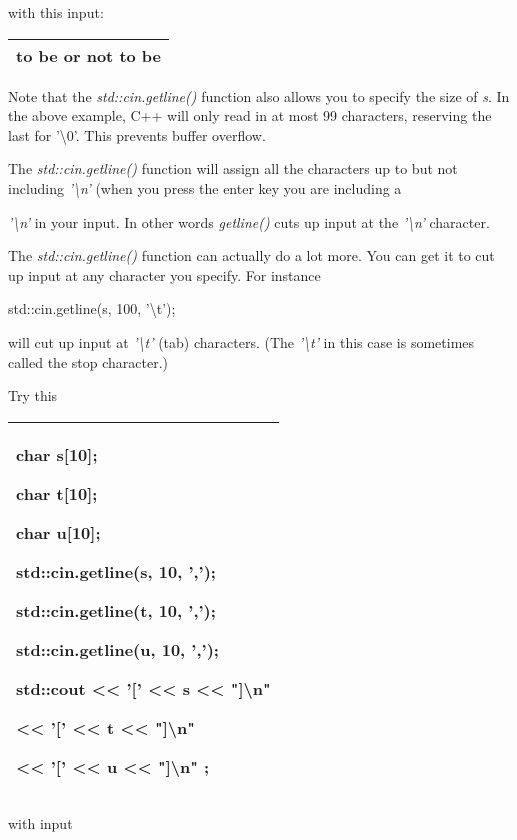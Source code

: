 \documentclass[
]{article}
\begin{document}
with this input:

\begin{longtable}[]{@{}l@{}}
\toprule
\endhead
to be or not to be\tabularnewline
\bottomrule
\end{longtable}

Note that the \emph{std::cin.getline()} function also allows you to
specify the size of \emph{s}. In the above example, C++ will only read
in at most 99 characters, reserving the last for '\textbackslash0'. This
prevents buffer overflow.

The \emph{std::cin.getline()} function will assign all the characters up
to but not including \emph{'\textbackslash n'} (when you press the enter
key you are including a

\emph{'\textbackslash n'} in your input. In other words \emph{getline()}
cuts up input at the \emph{'\textbackslash n'} character.

The \emph{std::cin.getline()} function can actually do a lot more. You
can get it to cut up input at any character you specify. For instance
\emph{ }

std::cin.getline(s, 100, '\textbackslash t');

will cut up input at \emph{'\textbackslash t'} (tab) characters. (The
\emph{'\textbackslash t'} in this case is sometimes called the stop
character.)

Try this

\begin{longtable}[]{@{}l@{}}
\toprule
\endhead
\begin{minipage}[t]{0.97\columnwidth}\raggedright
char s{[}10{]};

char t{[}10{]};

char u{[}10{]};

std::cin.getline(s, 10, ',');

std::cin.getline(t, 10, ',');

std::cin.getline(u, 10, ',');

std::cout \textless\textless{} '{[}' \textless\textless{} s
\textless\textless{} "{]}\textbackslash n"

\textless\textless{} '{[}' \textless\textless{} t \textless\textless{}
"{]}\textbackslash n"

\textless\textless{} '{[}' \textless\textless{} u \textless\textless{}
"{]}\textbackslash n" ;\strut
\end{minipage}\tabularnewline
\bottomrule
\end{longtable}

with input
\end{document}
